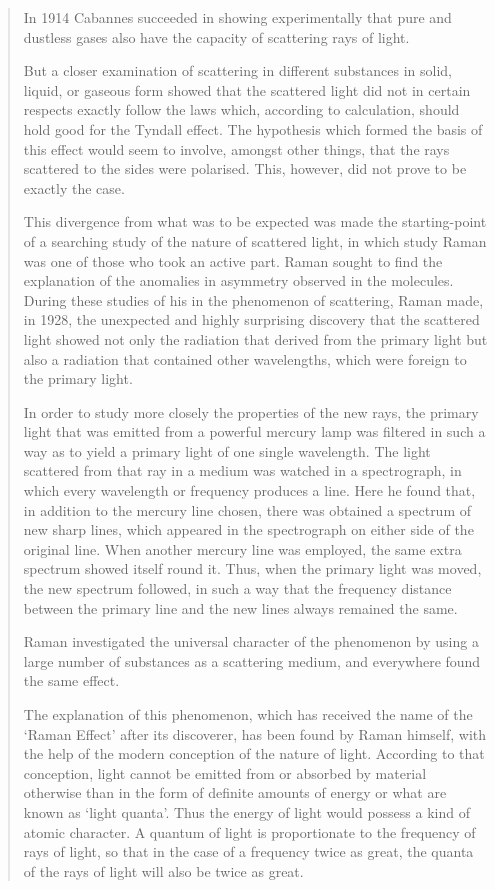\begin{quote}
{In 1914 Cabannes succeeded in showing experimentally that
pure and dustless gases also have the capacity of scattering rays
of light.

But a closer examination of scattering in different substances
in solid, liquid, or gaseous form showed that the scattered light
did not in certain respects exactly follow the laws which, according
to calculation, should hold good for the Tyndall effect. The
hypothesis which formed the basis of this effect would seem to
involve, amongst other things, that the rays scattered to the sides
were polarised. This, however, did not prove to be exactly the case.

This divergence from what was to be expected was made the
starting-point of a searching study of the nature of scattered light,
in which study Raman was one of those who took an active part.
Raman sought to find the explanation of the anomalies in
asymmetry observed in the molecules. During these studies of his
in the phenomenon of \hbox{scattering}, Raman made, in 1928, the
unexpected and highly surprising discovery that the scattered light
showed not only the radiation that derived from the primary light
but also a radiation that contained other wavelengths, which were
foreign to the primary light.

In order to study more closely the properties of the new rays,
the primary light that was emitted from a powerful mercury lamp
was filtered in such a way as to yield a primary light of one single
wavelength. The light scattered from that ray in a medium was
watched in a spectrograph, in which every wavelength or
frequency produces a line. Here he found that, in addition to the
mercury line chosen, there was obtained a spectrum of new sharp
lines, which appeared in the spectrograph on either side of the
original line. When another mercury line was employed, the same
extra spectrum showed itself round it. Thus, when the primary
light was moved, the new spectrum followed, in such a way that
the frequency distance between the primary line and the new lines
always remained the same.

Raman investigated the universal character of the
phenomenon by using a large number of substances as a scattering
medium, and everywhere found the same effect.

The explanation of this phenomenon, which has received the
name of the `Raman Effect' after its discoverer, has been found
by Raman himself, with the help of the modern conception of
the nature of light. According to that conception, light cannot
be emitted from or absorbed by material otherwise than in the
form of definite amounts of energy or what are known as `light
quanta'. Thus the energy of light would possess a kind of atomic
character. A quantum of light is proportionate to the frequency
of rays of light, so that in the case of a frequency twice as great,
the quanta of the rays of light will also be twice as great.

}
\end{quote}
